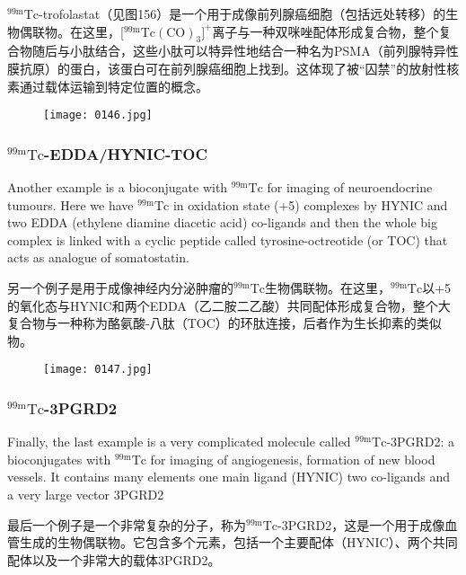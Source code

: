 \documentclass[dvipsnames, svgnames,a4paper,11pt]{article}
\begin{document}
${}^\mathrm{99m}\mathrm{Tc}$-trofolastat（见图156）是一个用于成像前列腺癌细胞（包括远处转移）的生物偶联物。在这里，[${}^\mathrm{99m}\mathrm{Tc(CO)_3}]^+$离子与一种双咪唑配体形成复合物，整个复合物随后与小肽结合，这些小肽可以特异性地结合一种名为PSMA（前列腺特异性膜抗原）的蛋白，该蛋白可在前列腺癌细胞上找到。这体现了被“囚禁”的放射性核素通过载体运输到特定位置的概念。

\begin{figure}[h]
	\centering
    \texttt{[image: 0146.jpg]}    
     \label{fig156}
\end{figure}

\subsubsection{${}^\mathrm{99m}\mathrm{Tc}$-EDDA/HYNIC-TOC}
Another example is a bioconjugate with ${}^\mathrm{99m}\mathrm{Tc}$ for imaging of neuroendocrine tumours.
Here we have ${}^\mathrm{99m}\mathrm{Tc}$ in oxidation state (+5) complexes by HYNIC and two EDDA
(ethylene diamine diacetic acid) co-ligands and then the whole big complex is linked
with a cyclic peptide called tyrosine-octreotide (or TOC) that acts as analogue of
somatostatin.

另一个例子是用于成像神经内分泌肿瘤的${}^\mathrm{99m}\mathrm{Tc}$生物偶联物。在这里，${}^\mathrm{99m}\mathrm{Tc}$以+5的氧化态与HYNIC和两个EDDA（乙二胺二乙酸）共同配体形成复合物，整个大复合物与一种称为酪氨酸-八肽（TOC）的环肽连接，后者作为生长抑素的类似物。
\begin{figure}[h]
	\centering
    \texttt{[image: 0147.jpg]}    
     \label{fig157}
\end{figure}
\subsubsection{${}^\mathrm{99m}\mathrm{Tc}$-3PGRD2}
Finally, the last example is a very complicated molecule called ${}^\mathrm{99m}\mathrm{Tc}$-3PGRD2: a
bioconjugates with ${}^\mathrm{99m}\mathrm{Tc}$ for imaging of angiogenesis, formation of new blood
vessels. It contains many elements one main ligand (HYNIC) two co-ligands and a
very large vector 3PGRD2

最后一个例子是一个非常复杂的分子，称为${}^\mathrm{99m}\mathrm{Tc}$-3PGRD2，这是一个用于成像血管生成的生物偶联物。它包含多个元素，包括一个主要配体（HYNIC）、两个共同配体以及一个非常大的载体3PGRD2。
\end{document}
